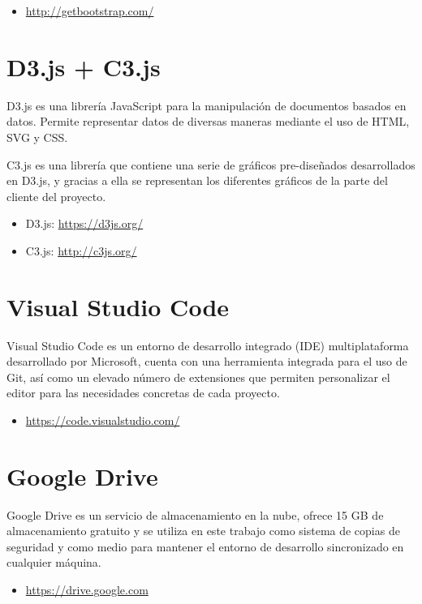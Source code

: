 \begin{itemize}
	\item \url{http://getbootstrap.com/}
\end{itemize}

\section{D3.js + C3.js}

D3.js es una librería JavaScript para la manipulación de documentos basados en datos. Permite representar datos de diversas maneras mediante el uso de HTML, SVG y CSS.

C3.js es una librería que contiene una serie de gráficos pre-diseñados desarrollados en D3.js, y gracias a ella se representan los diferentes gráficos de la parte del cliente del proyecto.
 
\begin{itemize}
	\item D3.js: \url{https://d3js.org/}
	\item C3.js: \url{http://c3js.org/}
\end{itemize}

\section{Visual Studio Code}

Visual Studio Code es un entorno de desarrollo integrado (IDE) multiplataforma desarrollado por Microsoft, cuenta con una herramienta integrada para el uso de Git, así como un elevado número de extensiones que permiten personalizar el editor para las necesidades concretas de cada proyecto.

\begin{itemize}
	\item \url{https://code.visualstudio.com/}
\end{itemize}

\section{Google Drive}

Google Drive es un servicio de almacenamiento en la nube, ofrece 15 GB de almacenamiento gratuito y se utiliza en este trabajo como sistema de copias de seguridad y como medio para mantener el entorno de desarrollo sincronizado en cualquier máquina.

\begin{itemize}
	\item \url{https://drive.google.com}
\end{itemize}

